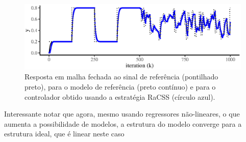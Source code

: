 \begin{exmp}
  \begin{figure}[H]
    \centering
    \includegraphics{./Figs/s.motorcc.VRFT.racss_output.mf.eps}
    \caption{Resposta em malha fechada ao sinal de referência (pontilhado preto), para o modelo de referência (preto contínuo) e para o controlador obtido usando a estratégia RaCSS (círculo azul).}
    \label{fig:}
  \end{figure}

  Interessante notar que agora, mesmo usando regressores não-lineares, o que aumenta a possibilidade de modelos, a estrutura do modelo converge para a estrutura ideal, que é linear neste caso


\end{exmp}


